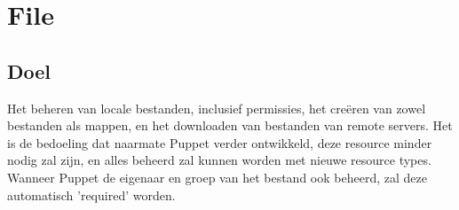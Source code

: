 \section{File}

\subsection{Doel}
Het beheren van locale bestanden, inclusief permissies, het cre\"{e}ren van zowel bestanden als mappen, en het downloaden van bestanden van remote servers. Het is de bedoeling dat naarmate Puppet verder ontwikkeld, deze resource minder nodig zal zijn, en alles beheerd zal kunnen worden met nieuwe resource types. Wanneer Puppet de eigenaar en groep van het bestand ook beheerd, zal deze automatisch 'required' worden.\\\\
%
